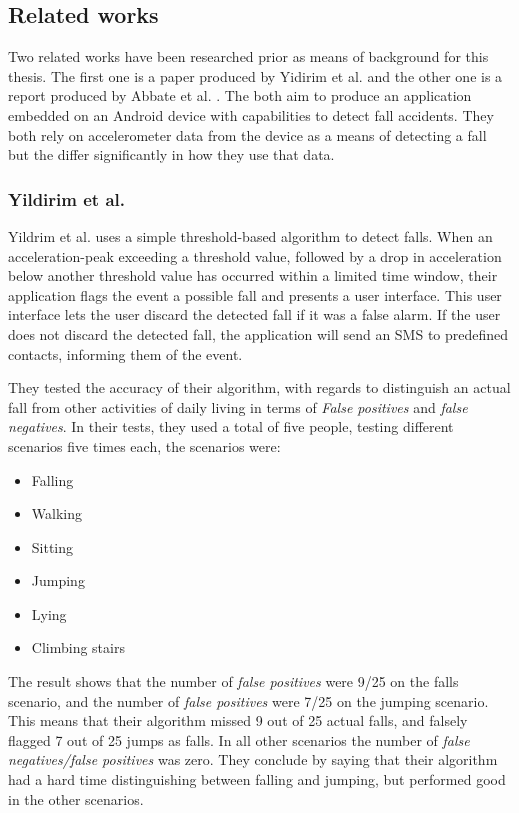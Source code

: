 \documentclass[12pt, a4paper, onecolumn]{article}
\begin{document}
	
	\subsection{Related works} Two related works have been researched prior as means of background for this thesis. The first one is a paper produced by Yidirim et al. \cite{int_journ} and the other one is a report produced by Abbate et al. \cite{piza_uni}. The both aim to produce an application embedded on an Android device with capabilities to detect fall accidents. They both rely on accelerometer data from the device as a means of detecting a fall but the differ significantly in how they use that data. 
	
	\subsubsection{Yildirim et al.}
	Yildrim et al. \cite{int_journ} uses a simple threshold-based algorithm to detect falls. When an acceleration-peak exceeding a threshold value, followed by a drop in acceleration below another threshold value has occurred within a limited time window, their application flags the event a possible fall and presents a user interface. This user interface lets the user discard the detected fall if it was a false alarm. If the user does not discard the detected fall, the application will send an SMS to predefined contacts, informing them of the event. 
	
	They tested the accuracy of their algorithm, with regards to distinguish an actual fall from other activities of daily living in terms of \textit{False positives} and \textit{false negatives}. In their tests, they used a total of five people, testing different scenarios five times each, the scenarios were:
	
	\begin{itemize}
		\item Falling
		\item Walking
		\item Sitting
		\item Jumping
		\item Lying
		\item Climbing stairs
	\end{itemize}
	
	The result shows that the number of \textit{false positives} were 9/25 on the falls scenario, and the number of \textit{false positives} were 7/25 on the jumping scenario. This means that their algorithm missed 9 out of 25 actual falls, and falsely flagged 7 out of 25 jumps as falls. In all other scenarios the number of \textit{false negatives/false positives} was zero. They conclude by saying that their algorithm had a hard time distinguishing between falling and jumping, but performed good in the other scenarios. 
	
\end{document}
